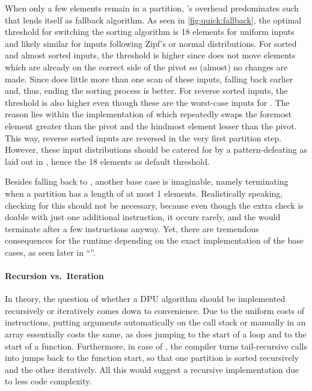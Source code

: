 When only a few elements remain in a partition, \QS{}'s overhead predominates such that \IS{} lends itself as fallback algorithm.
As seen in \cref{fig:quick:fallback}, the optimal threshold for switching the sorting algorithm is 18 elements for uniform inputs and likely similar for inputs following Zipf's or normal distributions.
For sorted and almost sorted inputs, the threshold is higher since \QS{} does not move elements which are already on the correct side of the pivot so (almost) no changes are made.
Since \IS{} does little more than one scan of these inputs, falling back earlier and, thus, ending the sorting process is better.
For reverse sorted inputs, the threshold is also higher even though these are the worst-case inputs for \IS{}.
The reason lies within the implementation of \QS{} which repeatedly swaps the foremost element greater than the pivot and the hindmost element lesser than the pivot.
This way, reverse sorted inputs are reversed in the very first partition step.
However, these input distributions should be catered for by a pattern-defeating \QS{} as laid out in , hence the 18 elements as default threshold.

Besides falling back to \IS{}, another base case is imaginable, namely terminating when a partition has a length of at most 1 elements.
Realistically speaking, checking for this should not be necessary, because even though the extra check is doable with just one additional instruction, it occurs rarely, and the \IS{} would terminate after a few instructions anyway.
Yet, there are tremendous consequences for the runtime depending on the exact implementation of the base cases, as seen later in \enquote{}.


\paragraph{Recursion vs.\ Iteration}
In theory, the question of whether a DPU algorithm should be implemented recursively or iteratively comes down to convenience.
Due to the uniform costs of instructions, putting arguments automatically on the call stack or manually in an array essentially costs the same, as does jumping to the start of a loop and to the start of a function.
Furthermore, in case of \QS{}, the compiler turns tail-recursive calls into jumps back to the function start, so that one partition is sorted recursively and the other iteratively.
All this would suggest a recursive implementation due to less code complexity.

